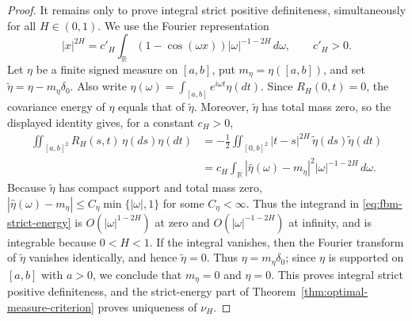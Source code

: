 \documentclass[11pt]{amsart}
\theoremstyle{definition}
\theoremstyle{remark}
\begin{document}
\begin{proof}
It remains only to prove integral strict positive definiteness,
simultaneously for all $H\in(0,1)$.  We use the Fourier representation
 \[
 |x|^{2H}=c'_H\int_{\mathbb R}
 (1-\cos(\omega x))|\omega|^{-1-2H}\,d\omega,
 \qquad c'_H>0.
\]
Let $\eta$ be a finite signed measure on $[a,b]$, put
$m_\eta=\eta([a,b])$, and set
$\widetilde\eta=\eta-m_\eta\delta_0$.  Also write
$\widehat\eta(\omega)=\int_{[a,b]}e^{i\omega t}\eta(dt)$.  Since
$R_H(0,t)=0$, the covariance energy of $\eta$ equals that of
$\widetilde\eta$.  Moreover, $\widetilde\eta$ has total mass zero, so the
displayed identity gives, for a constant $c_H>0$,
\begin{align}
 \iint_{[a,b]^2}R_H(s,t)\,\eta(ds)\eta(dt)
 &=-\frac12\iint_{[0,b]^2}|t-s|^{2H}\,
                    \widetilde\eta(ds)\widetilde\eta(dt)\nonumber\\
 &=c_H\int_{\mathbb R}|\widehat\eta(\omega)-m_\eta|^2
                    |\omega|^{-1-2H}\,d\omega.
 \label{eq:fbm-strict-energy}
\end{align}
Because $\widetilde\eta$ has compact support and total mass zero,
$|\widehat\eta(\omega)-m_\eta|\leq C_\eta\min\{|\omega|,1\}$ for some
$C_\eta<\infty$.  Thus the
integrand in \eqref{eq:fbm-strict-energy} is $O(|\omega|^{1-2H})$ at zero
and $O(|\omega|^{-1-2H})$ at infinity, and is integrable because $0<H<1$.
If the integral vanishes, then the Fourier transform of
$\widetilde\eta$ vanishes identically, and hence $\widetilde\eta=0$.
Thus $\eta=m_\eta\delta_0$; since $\eta$ is supported on $[a,b]$ with $a>0$,
we conclude that $m_\eta=0$ and $\eta=0$.  This proves integral strict positive
definiteness, and the strict-energy part of
Theorem~\ref{thm:optimal-measure-criterion} proves uniqueness of $\nu_H$.
\end{proof}
 



\end{document}
